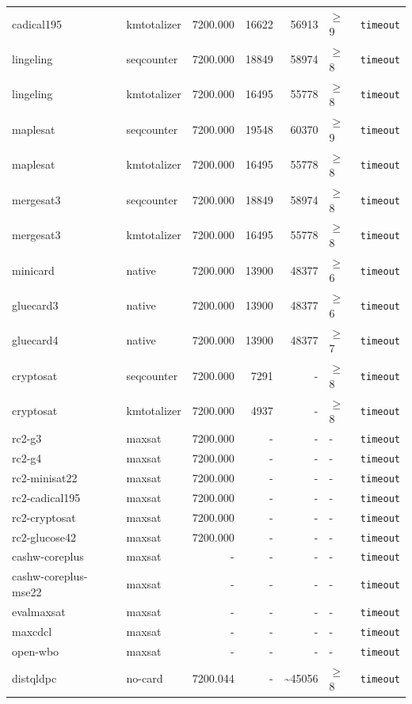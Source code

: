 \begin{longtable}{llrrrl p{}}
cadical195 & kmtotalizer & 7200.000 & 16622 & 56913 & $\geq$9 & \texttt{timeout} \\
lingeling & seqcounter & 7200.000 & 18849 & 58974 & $\geq$8 & \texttt{timeout} \\
lingeling & kmtotalizer & 7200.000 & 16495 & 55778 & $\geq$8 & \texttt{timeout} \\
maplesat & seqcounter & 7200.000 & 19548 & 60370 & $\geq$9 & \texttt{timeout} \\
maplesat & kmtotalizer & 7200.000 & 16495 & 55778 & $\geq$8 & \texttt{timeout} \\
mergesat3 & seqcounter & 7200.000 & 18849 & 58974 & $\geq$8 & \texttt{timeout} \\
mergesat3 & kmtotalizer & 7200.000 & 16495 & 55778 & $\geq$8 & \texttt{timeout} \\
minicard & native & 7200.000 & 13900 & 48377 & $\geq$6 & \texttt{timeout} \\
gluecard3 & native & 7200.000 & 13900 & 48377 & $\geq$6 & \texttt{timeout} \\
gluecard4 & native & 7200.000 & 13900 & 48377 & $\geq$7 & \texttt{timeout} \\
cryptosat & seqcounter & 7200.000 & 7291 & - & $\geq$8 & \texttt{timeout} \\
cryptosat & kmtotalizer & 7200.000 & 4937 & - & $\geq$8 & \texttt{timeout} \\
rc2-g3 & maxsat & 7200.000 & - & - & - & \texttt{timeout} \\
rc2-g4 & maxsat & 7200.000 & - & - & - & \texttt{timeout} \\
rc2-minisat22 & maxsat & 7200.000 & - & - & - & \texttt{timeout} \\
rc2-cadical195 & maxsat & 7200.000 & - & - & - & \texttt{timeout} \\
rc2-cryptosat & maxsat & 7200.000 & - & - & - & \texttt{timeout} \\
rc2-glucose42 & maxsat & 7200.000 & - & - & - & \texttt{timeout} \\
cashw-coreplus & maxsat & - & - & - & - & \texttt{timeout} \\
cashw-coreplus-mse22 & maxsat & - & - & - & - & \texttt{timeout} \\
evalmaxsat & maxsat & - & - & - & - & \texttt{timeout} \\
maxcdcl & maxsat & - & - & - & - & \texttt{timeout} \\
open-wbo & maxsat & - & - & - & - & \texttt{timeout} \\
distqldpc & no-card & 7200.044 & - & \textasciitilde{}45056 & $\geq$8 & \texttt{timeout} \\

\end{longtable}
